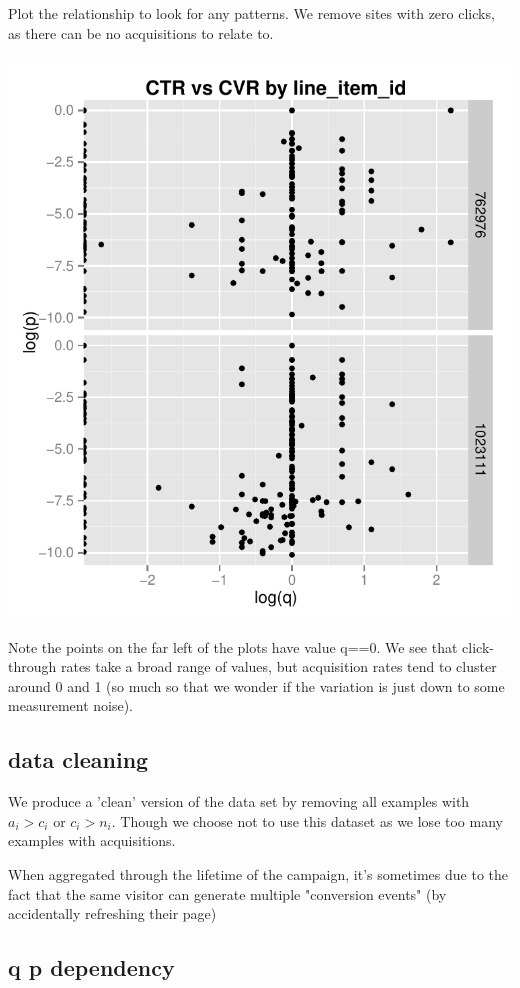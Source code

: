 \documentclass[11pt,a4,singlespacing,titlepagenumber=on]{scrreprt}
\numberwithin{equation}{chapter} %
\theoremstyle{remark}
\begin{document}
Plot the relationship to look for any patterns. We remove sites with zero clicks, as there can be no acquisitions to relate to. 

\includegraphics{CTRvsCVR}

Note the points on the far left of the plots have value q==0.  We see that click-through rates take a broad range of values, but acquisition rates tend to cluster around 0 and 1  (so much so that we wonder if the variation is just down to some measurement noise).

\subsection{data cleaning}

We produce a 'clean' version of the data set by removing all examples with $a_i > c_i$ or $c_i > n_i$. Though we choose not to use this dataset as we lose too many examples with acquisitions.

When aggregated through the lifetime of the campaign, it's sometimes due to the fact that the same visitor can generate multiple "conversion events" (by accidentally refreshing their page)

\subsection{q p dependency}
\end{document}
